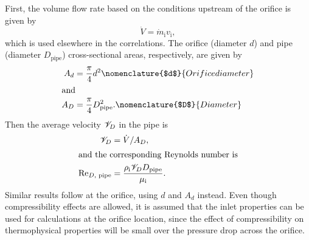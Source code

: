 First, the volume flow rate based on the conditions 
upstream of the orifice is given by
\begin{equation}
  \dot{V} = \dot{m}_{\text{i}}v_{\text{i}},
\end{equation}
which is used elsewhere in the correlations.
The orifice (diameter $d$) and 
pipe (diameter $D_{\text{pipe}}$) cross-sectional areas, 
respectively, are given by
\begin{align}
  A_d &= \frac{\pi}{4} d^2 
  \nomenclature{$d$}{Orifice diameter\nomunit{\inch}} \\
  \shortintertext{and}
  A_D &= \frac{\pi}{4} D_{\text{pipe}}^2.
  \nomenclature{$D$}{Diameter\nomunit{\foot,\,\inch}}
\end{align}
Then  the average velocity $\mathscr{V}_D$ in the pipe is
\begin{align}
  \mathscr{V}_D &= \dot{V}/A_D, \\
  \intertext{and the corresponding Reynolds number is}
  \mathrm{Re}_{D,\text{ pipe}} &= \frac{\rho_{\text{i}} \mathscr{V}_D D_{\text{pipe}}}{\mu_{\text{i}}}.
\end{align}
Similar results follow at the orifice, using $d$ and $A_d$ instead.
Even though compressibility effects are allowed, it is assumed that the inlet properties
can be used for calculations at the orifice location, since the effect of compressibility
on thermophysical properties will be small over the pressure drop across the orifice.


